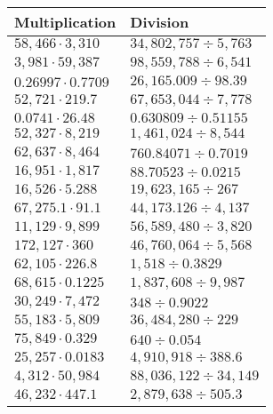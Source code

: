 \begin{longtable}[]{@{}ll@{}}
\toprule
Multiplication & Division\tabularnewline
\midrule
\endhead
\(58,466\cdot3,310\) & \(34,802,757÷5,763\)\tabularnewline
\(3,981\cdot59,387\) & \(98,559,788÷6,541\)\tabularnewline
\(0.26997\cdot0.7709\) & \(26,165.009÷98.39\)\tabularnewline
\(52,721\cdot219.7\) & \(67,653,044÷7,778\)\tabularnewline
\(0.0741\cdot26.48\) & \(0.630809÷0.51155\)\tabularnewline
\(52,327\cdot8,219\) & \(1,461,024÷8,544\)\tabularnewline
\(62,637\cdot8,464\) & \(760.84071÷0.7019\)\tabularnewline
\(16,951\cdot1,817\) & \(88.70523÷0.0215\)\tabularnewline
\(16,526\cdot5.288\) & \(19,623,165÷267\)\tabularnewline
\(67,275.1\cdot91.1\) & \(44,173.126÷4,137\)\tabularnewline
\(11,129\cdot9,899\) & \(56,589,480÷3,820\)\tabularnewline
\(172,127\cdot360\) & \(46,760,064÷5,568\)\tabularnewline
\(62,105\cdot226.8\) & \(1,518÷0.3829\)\tabularnewline
\(68,615\cdot0.1225\) & \(1,837,608÷9,987\)\tabularnewline
\(30,249\cdot7,472\) & \(348÷0.9022\)\tabularnewline
\(55,183\cdot5,809\) & \(36,484,280÷229\)\tabularnewline
\(75,849\cdot0.329\) & \(640÷0.054\)\tabularnewline
\(25,257\cdot0.0183\) & \(4,910,918÷388.6\)\tabularnewline
\(4,312\cdot50,984\) & \(88,036,122÷34,149\)\tabularnewline
\(46,232\cdot447.1\) & \(2,879,638÷505.3\)\tabularnewline
\bottomrule
\end{longtable}
